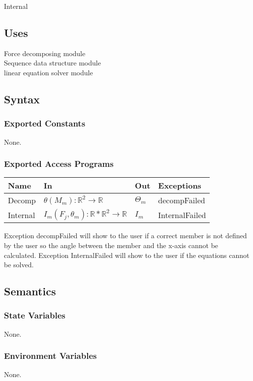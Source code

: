 \documentclass[12pt, titlepage]{article}
\begin{document}
Internal

\subsection{Uses}
Force decomposing module\\
Sequence data structure module\\
linear equation solver module\\



\subsection{Syntax}

\subsubsection{Exported Constants}
None.
\subsubsection{Exported Access Programs}
\begin{center}
\begin{tabular}{p{2cm} p{4cm} p{4cm} p{2cm}}
\hline
\textbf{Name} & \textbf{In} & \textbf{Out} & \textbf{Exceptions} \\
\hline
Decomp & $\theta(M_{m}):\mathbb{R}^{2} \rightarrow \mathbb{R}$  &$\Theta_m$ & decompFailed \\
Internal & $I_m(F_j,\theta_m):\mathbb{R}*\mathbb{R}^{2} \rightarrow \mathbb{R}$  &$I_m$ & InternalFailed \\
\hline
\end{tabular}
\end{center}
Exception decompFailed will show to the user if a correct member is not defined by the user so the angle between the member and the x-axis cannot be calculated. Exception InternalFailed will show to the user if the equations cannot be solved.
\subsection{Semantics}
\subsubsection{State Variables}
None.

\subsubsection{Environment Variables}
None.
\end{document}
